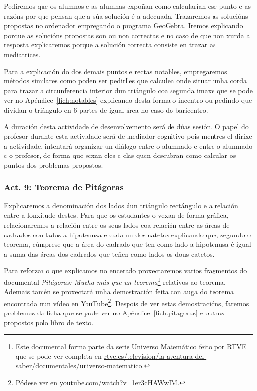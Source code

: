 Pediremos que os alumnos e as alumnas expoñan como calcularían ese punto e as razóns por que pensan que a súa solución é a adecuada. Trazaremos as solucións propostas no ordenador empregando o programa GeoGebra. Iremos explicando porque as solucións propostas son ou non correctas e no caso de que non xurda a resposta explicaremos porque a solución correcta consiste en trazar as mediatrices.

Para a explicación do dos demais puntos e rectas notables, empregaremos métodos similares como poden ser pedirlles que calculen onde situar unha corda para trazar a circunferencia interior dun triángulo coa segunda imaxe que se pode ver no Apéndice~\ref{fich:notables} explicando desta forma o incentro ou pedindo que dividan o triángulo en 6 partes de igual área no caso do baricentro.

A duración desta actividade de desenvolvemento será de dúas sesión. O papel do profesor durante esta actividade será de mediador cognitivo pois mentres el dirixe a actividade, intentará organizar un diálogo entre o alumnado e entre o alumnado e o profesor, de forma que sexan eles e elas quen descubran como calcular os puntos dos problemas propostos.

\subsubsection{Act. 9: Teorema de Pitágoras}\label{act:pitagoras}
Explicaremos a denominación dos lados dun triángulo rectángulo e a relación entre a lonxitude destes. Para que os estudantes o vexan de forma gráfica, relacionaremos a relación entre os seus lados coa relación entre as áreas de cadrados con lados a hipotenusa e cada un dos catetos explicando que, segundo o teorema, cúmprese que a área do cadrado  que ten como lado a hipotenusa é igual a suma das áreas dos cadrados que teñen como lados os dous catetos.

Para reforzar o que explicamos no encerado proxectaremos varios fragmentos do documental \emph{Pitágoras: Mucha más que un teorema}\footnote{Este documental forma parte da serie Universo Matemático feito por RTVE que se pode ver completa en \href{http://www.rtve.es/television/la-aventura-del-saber/documentales/universo-matematico/}{rtve.es/television/la-aventura-del-saber/documentales/universo-matematico}.} relativos ao teorema. Ademais tamén se proxectará unha demostración feita con auga do teorema encontrada nun vídeo en YouTube\footnote{Pódese ver en \href{https://www.youtube.com/watch?v=1er3cHAWwIM}{youtube.com/watch?v=1er3cHAWwIM}.}. Despois de ver estas demostracións, faremos problemas da ficha que se pode ver no Apéndice~\ref{fich:pitagoras} e outros propostos polo libro de texto.

